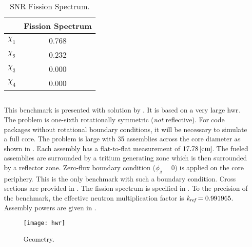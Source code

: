    \restoregeometry
    \pagestyle{plain}
    \thispagestyle{plain}

    \begin{table}
      \caption{SNR Fission Spectrum.}
      \label{tab:snrchi}
      \begin{center}
        \begin{tabular}{cc}
          \toprule
          &Fission Spectrum \\
          \midrule
          $\chi_1$ &0.768 \\
          $\chi_2$ &0.232 \\
          $\chi_3$ &0.000 \\
          $\chi_4$ &0.000 \\
          \bottomrule
        \end{tabular}
      \end{center}
    \end{table}

  \subsection{\texorpdfstring{}{HWR}}
    \label{sec:hwr}
    This benchmark is presented with solution by \textcite{chao}.
    It is based on a very large \gls{hwr}. The problem is one-sixth rotationally
    symmetric (\textit{not} reflective). For code packages without rotational
    boundary conditions, it will be necessary to simulate a full core. The
    problem is large with 35 assemblies across the core diameter as shown in
    . Each assembly has a flat-to-flat measurement of ${17.78
    \left[\text{{cm}}\right]}$. The fueled assemblies are surrounded by a tritium generating
    zone which is then surrounded by a reflector zone. Zero-flux boundary
    condition ($\phi_g = 0$) is applied on the core periphery. This is the only
    benchmark with such a boundary condition. Cross sections are provided in
    . The fission spectrum is specified in . To
    the precision of the benchmark, the effective neutron multiplication factor
    is $k_{\!\mbox{\scriptsize \em ref}} = 0.991965$. Assembly powers are given in .

    \begin{figure}
      \centering
      \texttt{[image: hwr]}
      \caption{ Geometry.}
      \label{fig:hwr_geom}
    \end{figure}

